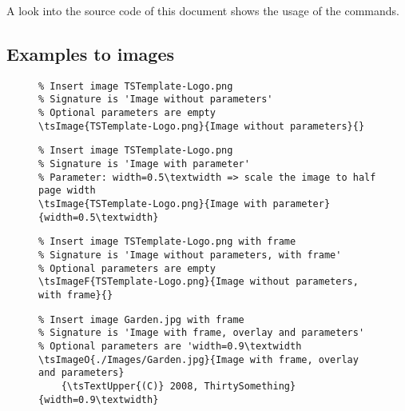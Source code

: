 A look into the source code of this document shows the usage of the commands.

\subsection{Examples to images}

\begin{figure}[H]
    \small
    \centering
    \begin{BVerbatim}
\tsImage{TSTemplate-Logo.png}{Image without parameters}{}
    \end{BVerbatim}
\end{figure}


\begin{figure}[H]
    \small
    \centering
    \begin{BVerbatim}
\tsImage{TSTemplate-Logo.png}{Image with parameter}{width=0.5\textwidth}
    \end{BVerbatim}
\end{figure}


\begin{figure}[H]
    \small
    \centering
    \begin{BVerbatim}
\tsImageF{TSTemplate-Logo.png}{Image without parameters, with frame}{}
    \end{BVerbatim}
\end{figure}


\begin{figure}[H]
    \small
    \centering
    \begin{BVerbatim}
\tsImageO{./Images/Garden.jpg}{Image with frame, overlay and parameters}
    {\tsTextUpper{(C)} 2008, ThirtySomething}{width=0.9\textwidth}
    \end{BVerbatim}
\end{figure}

